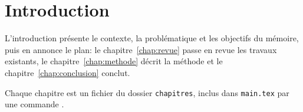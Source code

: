 \chapter{Introduction}
\label{chap:introduction}

L'introduction présente le contexte, la problématique et les objectifs du
mémoire, puis en annonce le plan: le chapitre~\ref{chap:revue} passe en revue
les travaux existants, le chapitre~\ref{chap:methode} décrit la méthode et
le chapitre~\ref{chap:conclusion} conclut.

Chaque chapitre est un fichier du dossier \texttt{chapitres}, inclus dans
\texttt{main.tex} par une commande \verb||.
